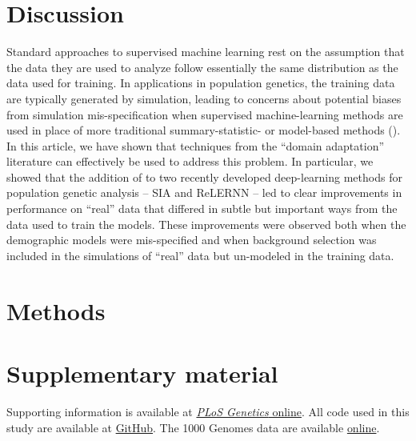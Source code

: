 \section{Discussion} \label{DA-discussion}
Standard approaches to supervised machine learning rest on the assumption that the data they are used to analyze follow essentially the same distribution as the data used for training. In applications in population genetics, the training data are typically generated by simulation, leading to concerns about potential biases from simulation mis-specification when supervised machine-learning methods are used in place of more traditional summary-statistic- or model-based methods (\cite{caldas_inference_2022,korfmann_deep_2023}). In this article, we have shown that techniques from the “domain adaptation” literature can effectively be used to address this problem. In particular, we showed that the addition of  to two recently developed deep-learning methods for population genetic analysis -- \ac{SIA} and ReLERNN -- led to clear improvements in performance on “real” data that differed in subtle but important ways from the data used to train the models. These improvements were observed both when the demographic models were mis-specified and when background selection was included in the simulations of “real” data but un-modeled in the training data.



\section{Methods} \label{DA-methods}

\section{Supplementary material}
Supporting information is available at \href{https://journals.plos.org/plosgenetics/article?id=10.1371/journal.pgen.1011032#sec018}{\textit{PLoS Genetics} online}. All code used in this study are available at \href{https://github.com/ziyimo/popgen-dom-adapt}{GitHub}. The 1000 Genomes data are available \href{https://www.internationalgenome.org/data}{online}.
